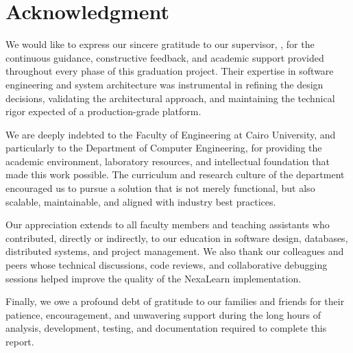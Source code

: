
\chapter*{Acknowledgment}

We would like to express our sincere gratitude to our supervisor, \SupervisorName, for the continuous guidance, constructive feedback, and academic support provided throughout every phase of this graduation project. Their expertise in software engineering and system architecture was instrumental in refining the design decisions, validating the architectural approach, and maintaining the technical rigor expected of a production-grade platform.

We are deeply indebted to the Faculty of Engineering at Cairo University, and particularly to the Department of Computer Engineering, for providing the academic environment, laboratory resources, and intellectual foundation that made this work possible. The curriculum and research culture of the department encouraged us to pursue a solution that is not merely functional, but also scalable, maintainable, and aligned with industry best practices.

Our appreciation extends to all faculty members and teaching assistants who contributed, directly or indirectly, to our education in software design, databases, distributed systems, and project management. We also thank our colleagues and peers whose technical discussions, code reviews, and collaborative debugging sessions helped improve the quality of the NexaLearn implementation.

Finally, we owe a profound debt of gratitude to our families and friends for their patience, encouragement, and unwavering support during the long hours of analysis, development, testing, and documentation required to complete this report.

\clearpage
